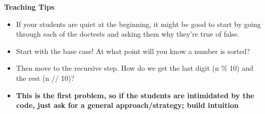 \begin{blocksection}
\begin{guide}
  \textbf{Teaching Tips}
  \begin{itemize}
      \item If your students are quiet at the beginning, it might be good to start by going through each of the doctests and asking them why they're true of false.
      \item Start with the base case! At what point will you know a number is sorted?
      \item Then move to the recursive step. How do we get the last digit (n \% 10) and the rest (n // 10)?
      \item \textbf{This is the first problem, so if the students are intimidated by the code, just ask for a general approach/strategy; build intuition}
  \end{itemize}
\end{guide}
\end{blocksection}